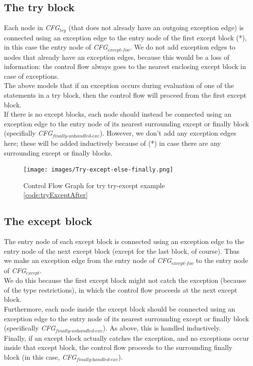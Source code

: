 \subsection{The try block}
Each node in \textit{CFG$_{\textit{try}}$} (that does not already have an outgoing exception edge) is connected using an exception edge to the entry node of the first except block (*), in this case the entry node of \textit{CFG$_{\textit{except-foo}}$}. We do not add exception edges to nodes that already have an exception edges, because this would be a loss of information: the control flow always goes to the nearest enclosing except block in case of exceptions. \\
The above models that if an exception occurs during evaluation of one of the statements in a try block, then the control flow will proceed from the first except block. \\
If there is no except blocks, each node should instead be connected using an exception edge to the entry node of its nearest surrounding except or finally block (specifially \textit{CFG$_{\textit{finally-unhandled-exc}}$}). However, we don't add any exception edges here; these will be added inductively because of (*) in case there are any surrounding except or finally blocks.

\begin{figure}
	\vspace{-20pt}
	\begin{center}
		\texttt{[image: images/Try-except-else-finally.png]}
	\end{center}
	\vspace{-10pt}
	\caption{Control Flow Graph for try try-except example \ref{code:tryExceptAfter}}
	\label{fig:tryExceptCfg}
	\vspace{-10pt}
\end{figure}
\subsection{The except block}
The entry node of each except block is connected using an exception edge to the entry node of the next except block (except for the last block, of course). Thus we make an exception edge from the entry node of \textit{CFG$_{\textit{except-foo}}$} to the entry node of \textit{CFG$_{\textit{except}}$}. \\
We do this because the first except block might not catch the exception (because of the type restrictions), in which the control flow proceeds at the next except block. \\
Furthermore, each node inside the except block should be connected using an exception edge to the entry node of its nearest surrounding except or finally block (specifically \textit{CFG$_{\textit{finally-unhandled-exc}}$}). As above, this is handled inductively. \\
Finally, if an except block actually catches the exception, and no exceptions occur inside that except block, the control flow proceeds to the surrounding finally block (in this case, \textit{CFG$_{\textit{finally-handled-exc}}$}). 

